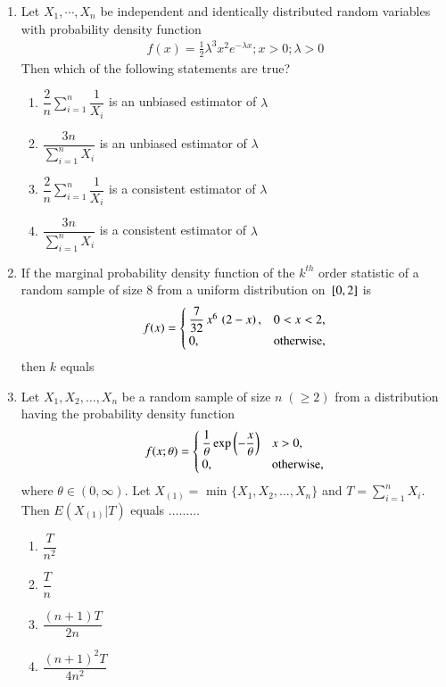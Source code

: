 \begin{enumerate}[label=\thesection.\arabic*.,ref=\thesection.\theenumi]
\item Let $ X_1, \cdots , X_n $ be independent and identically distributed random variables with probability density function
\begin{align}
    f(x) = \frac{1}{2} \lambda^3x^2e^{-\lambda x} ; x>0 ; \lambda > 0
    \label{stats/4/pdf}
\end{align}
Then which of the following statements are true?
\begin{enumerate}
    \item $\dfrac{2}{n} \sum_{i=1}^{n} \dfrac{1}{X_i} $ is an unbiased estimator of $ \lambda$
    \item $\dfrac{3n}{\sum_{i=1}^{n} X_i } $ is an unbiased estimator of $ \lambda$ \\
    \item $\dfrac{2}{n} \sum_{i=1}^{n} \dfrac{1}{X_i} $ is a consistent estimator of $ \lambda$
    \item $\dfrac{3n}{\sum_{i=1}^{n} X_i } $ is a consistent estimator of $ \lambda$
\end{enumerate}
\solution

%
\item If the marginal probability density function of the $k^{th}$ order statistic of a 
random sample of size 8 from a uniform distribution on ${}\left[0,2\right]$ is
\begin{align}
  f(x) =
  \begin{cases}
   \dfrac{7}{32}\,x^{6}\,\left(2-x\right),  & 0<x<2, \\ 
         0,               & \text{otherwise,} 
  \end{cases}
\label{stats/qnpdf}
\end{align}
then $k$ equals \underline{\hspace{3cm}}
%
\\
%
\solution

\item Let $X_1, X_2, \ldots , X_n$ be a random sample of size $n \; ( \geq 2 ) $ from a distribution having the probability density function
\begin{align}
f(x;\theta) = 
\begin{cases}
\dfrac{1}{\theta} \exp\left(-\dfrac{x}{\theta}\right) & x > 0, \\
0, & \text{otherwise,}
\end{cases}
\end{align}
where $\theta \in (0, \infty)$. Let $X_{(1)} = $ min $ \{ X_1, X_2, \ldots , X_n \} $ and $T = \sum_{i=1}^n X_i $. Then $E(X_{(1)} | T)$ equals $\ldots \ldots \ldots$
\begin{enumerate}[label = (\Alph*)]
\item $\dfrac{T}{n^2}$ \\
\item $\dfrac{T}{n}$ \\
\item $\dfrac{(n+1)T}{2n}$ \\
\item $\dfrac{(n+1)^2 T}{4n^2}$
\end{enumerate}
%
\solution



\end{enumerate}
